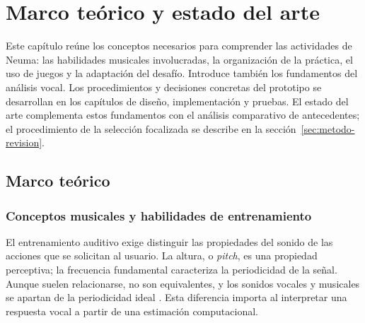 \chapter{Marco teórico y estado del arte}
\label{cap:marco}
Este capítulo reúne los conceptos necesarios para comprender las actividades de
Neuma: las habilidades musicales involucradas, la organización de la práctica,
el uso de juegos y la adaptación del desafío. Introduce también los fundamentos
del análisis vocal. Los procedimientos y decisiones concretas del prototipo se
desarrollan en los capítulos de diseño, implementación y pruebas. El estado del
arte complementa estos fundamentos con el análisis comparativo de antecedentes;
el procedimiento de la selección focalizada se describe en la sección~\ref{sec:metodo-revision}.

\section{Marco teórico}
\subsection{Conceptos musicales y habilidades de entrenamiento}
\label{sec:conceptos-habilidades}
\label{sec:altura-frecuencia}
\label{sec:intervalos-musicales}
\label{sec:afinacion-cents}
\label{sec:ritmo-pulso}
\label{sec:lectura-musical}
\label{sec:timbre-instrumentos}
\label{sec:escucha-conjuntos}
\label{sec:percepcion-produccion}
El entrenamiento auditivo exige distinguir las propiedades del sonido de las
acciones que se solicitan al usuario. La altura, o \textit{pitch}, es una
propiedad perceptiva; la frecuencia fundamental caracteriza la periodicidad
de la señal. Aunque suelen relacionarse, no son equivalentes, y los sonidos
vocales y musicales se apartan de la periodicidad ideal
\parencite[p.~1917]{decheveigne2002yin}. Esta diferencia importa al interpretar
una respuesta vocal a partir de una estimación computacional.


